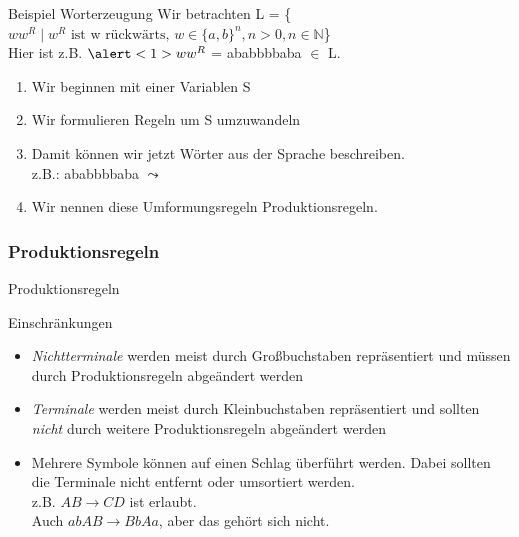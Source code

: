 \begin{frame}[fragile]{Beispiel Worterzeugung}
    \small{Wir betrachten L = \{$ww^R\;|\;w^R\text{ ist w rückwärts, }w \in \{a, b\}^n, n>0, n\in \mathbb{N}$\}\\
    Hier ist z.B. $\alert<1>{w}w^R$ = \alert<1>{ababb}bbaba $\in$ L.}\\
    \begin{enumerate}
    \item <2-> 
            \alert<2,5>{Wir beginnen mit einer Variablen S}
    \item <3-> 
            \alert<3>{Wir formulieren Regeln um S umzuwandeln}
            \alert<4>{}\vspace{-0.3in}
    \item <5->
            \alert<5>{Damit können wir jetzt Wörter aus der Sprache beschreiben.}\\
            z.B.: \alert<6>{a}\alert<7>{b}\alert<8>{a}\alert<9>{b}\alert<10>{bb}\alert<9>{b}\alert<8>{a}\alert<7>{b}\alert<6>{a} $\leadsto$ 
    \item <11> \alert<11>{Wir nennen diese Umformungsregeln Produktionsregeln.}
    \end{enumerate}
\end{frame}

\subsubsection{Produktionsregeln}
\begin{frame}{Produktionsregeln}
    \begin{alertblock}{Einschränkungen}
    \begin{itemize}
        \item \alert{\emph{Nichtterminale}} werden meist durch Großbuchstaben repräsentiert und müssen durch Produktionsregeln abgeändert werden
        \item \alert{\emph{Terminale}} werden meist durch Kleinbuchstaben repräsentiert und sollten \emph{nicht} durch weitere Produktionsregeln abgeändert werden
        \item Mehrere Symbole können auf einen Schlag überführt werden. Dabei sollten die Terminale nicht entfernt oder umsortiert werden.\\
        z.B. $AB \rightarrow CD$ ist erlaubt.\\
        Auch $abAB \rightarrow BbAa$, aber das gehört sich nicht.
    \end{itemize}
    \end{alertblock}
\end{frame}

